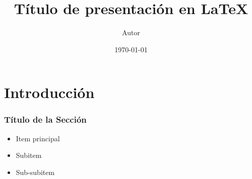 \documentclass{beamer}
\begin{document}
\title{Título de presentación en LaTeX}
\author{Autor}
\date{\today}

\frame{\titlepage}

\section{Introducción}
\begin{frame}
    \frametitle{Título de la Sección}
    \begin{itemize}
        \item Item principal
        \item Subitem
        \item Sub-subitem
    \end{itemize}
\end{frame}
\end{document}
